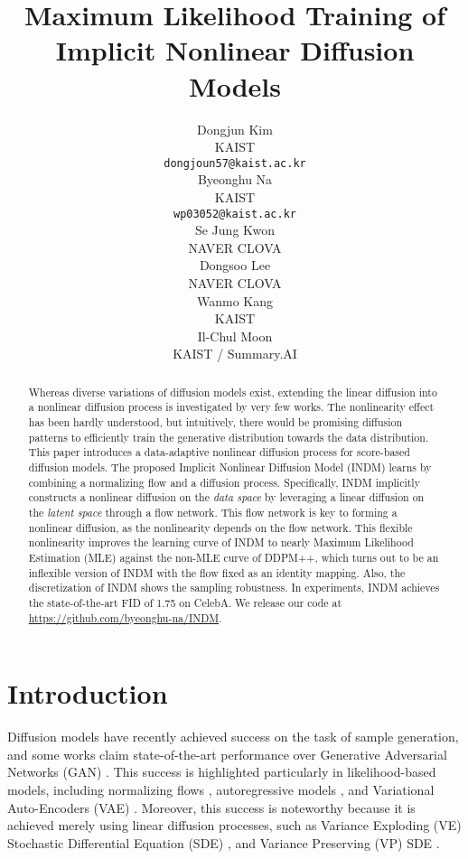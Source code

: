 \documentclass{article}
\title{Maximum Likelihood Training of\\Implicit Nonlinear Diffusion Models}
\author{Dongjun Kim\\KAIST \\
	\texttt{dongjoun57@kaist.ac.kr} \\
	\And
	Byeonghu Na\\
	KAIST \\
	\texttt{wp03052@kaist.ac.kr} \\
	\And
	Se Jung Kwon \\
	NAVER CLOVA \\
	\And
	Dongsoo Lee \\
	NAVER CLOVA \\
	\And
	Wanmo Kang \\
	KAIST \\
	\And
	Il-Chul Moon \\
	KAIST / Summary.AI \\
}
\theoremstyle{definition}
\theoremstyle{remark}
\begin{document}
	
	
	\maketitle
	\doparttoc
	\parttoc
	\def\thefootnote{*}
	\def\thefootnote{\arabic{footnote}}
	
	\begin{abstract}
		Whereas diverse variations of diffusion models exist, extending the linear diffusion into a nonlinear diffusion process is investigated by very few works. The nonlinearity effect has been hardly understood, but intuitively, there would be promising diffusion patterns to efficiently train the generative distribution towards the data distribution. This paper introduces a data-adaptive nonlinear diffusion process for score-based diffusion models. The proposed Implicit Nonlinear Diffusion Model (INDM) learns by combining a normalizing flow and a diffusion process. Specifically, INDM implicitly constructs a nonlinear diffusion on the \textit{data space} by leveraging a linear diffusion on the \textit{latent space} through a flow network. This flow network is key to forming a nonlinear diffusion, as the nonlinearity depends on the flow network. This flexible nonlinearity improves the learning curve of INDM to nearly Maximum Likelihood Estimation (MLE) against the non-MLE curve of DDPM++, which turns out to be an inflexible version of INDM with the flow fixed as an identity mapping. Also, the discretization of INDM shows the sampling robustness. In experiments, INDM achieves the state-of-the-art FID of 1.75 on CelebA. We release our code at \url{https://github.com/byeonghu-na/INDM}.
	\end{abstract}
	
	\reqnomode
	
	\section{Introduction}
	\label{sec:Introduction}
	
	Diffusion models have recently achieved success on the task of sample generation, and some works \cite{song2020score, dhariwal2021diffusion} claim state-of-the-art performance over Generative Adversarial Networks (GAN) \citep{karras2019style}. This success is highlighted particularly in likelihood-based models, including normalizing flows \citep{grcic2021densely}, autoregressive models \citep{parmar2018image}, and Variational Auto-Encoders (VAE) \citep{vahdat2020nvae}. Moreover, this success is noteworthy because it is achieved merely using linear diffusion processes, such as Variance Exploding (VE) Stochastic Differential Equation (SDE) \citep{song2020improved}, and Variance Preserving (VP) SDE \citep{ho2020denoising}.
	
\end{document}
